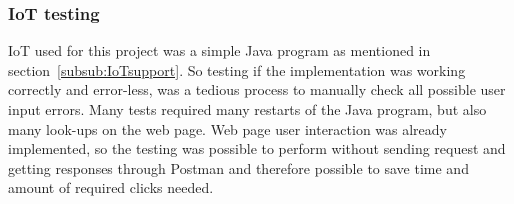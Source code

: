 \subsubsection{IoT testing}
IoT used for this project was a simple Java program as mentioned in section~\ref{subsub:IoTsupport}. So testing if the implementation was working correctly and error-less, was a tedious process to manually check all possible user input errors. Many tests required many restarts of the Java program, but also many look-ups on the web page. Web page user interaction was already implemented, so the testing was possible to perform without sending request and getting responses through Postman and therefore possible to save time and amount of required clicks needed.